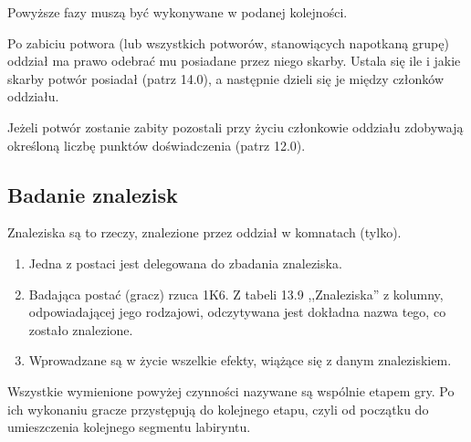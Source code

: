 Powyższe fazy muszą być wykonywane w podanej kolejności.

Po zabiciu potwora (lub wszystkich potworów, stanowiących napotkaną grupę) oddział ma prawo odebrać mu posiadane przez niego skarby.
Ustala się ile i jakie skarby potwór posiadał (patrz 14.0), a następnie dzieli się je między członków oddziału.

Jeżeli potwór zostanie zabity pozostali przy życiu członkowie oddziału zdobywają określoną liczbę punktów doświadczenia (patrz 12.0).

\subsection{Badanie znalezisk}

Znaleziska są to rzeczy, znalezione przez oddział w komnatach (tylko).

\begin{enumerate}
    \item
        Jedna z postaci jest delegowana do zbadania znaleziska.
    \item
        Badająca postać (gracz) rzuca 1K6.
        Z tabeli 13.9 ,,Znaleziska'' z kolumny, odpowiadającej jego rodzajowi, odczytywana jest dokładna nazwa tego, co zostało znalezione.
    \item
        Wprowadzane są w życie wszelkie efekty, wiążące się z danym znaleziskiem.
\end{enumerate}

Wszystkie wymienione powyżej czynności nazywane są wspólnie etapem gry.
Po ich wykonaniu gracze przystępują do kolejnego etapu, czyli od początku do umieszczenia kolejnego segmentu labiryntu.
